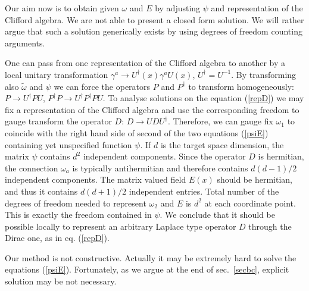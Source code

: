 \documentclass[a4paper,12pt,twoside]{article}
\begin{document}
Our aim now is to obtain given $\omega$ and $E$ by adjusting
$\psi$ and representation of the Clifford algebra. We are not able
to present a closed form solution. We will rather argue that such
a solution generically exists by using degrees of freedom counting
arguments. 

One can pass from one representation of the Clifford algebra to
another by a local unitary transformation 
$\gamma^a\to U^\dag (x)\gamma^a U(x)$, $U^\dag =U^{-1}$.
By transforming also $\tilde\omega$ and $\psi$ we can force
the operators $P$ and $P^\dag$ to transform homogeneously:
$P\to U^\dag PU$, $P^\dag P\to U^\dag P^\dag P U$.
To analyse solutions on the equation (\ref{repD}) we may fix
a representation of the Clifford algebra and use the corresponding
freedom to gauge transform the operator $D$:
$D\to UDU^\dag$. Therefore, we can
gauge fix $\omega_1$ to coincide with the right hand side of
second of the two equations (\ref{psiE}) containing yet unspecified
function $\psi$. If $d$ is the target space dimension, the 
matrix $\psi$ contains $d^2$ independent components.
Since the operator $D$ is hermitian, the connection $\omega_a$
is typically antihermitian and therefore contains $d(d-1)/2$
independent components. The matrix valued field $E(x)$ should be
hermitian, and thus it contains $d(d+1)/2$ independent entries.
Total number of the degrees of freedom needed to represent
$\omega_2$ and $E$ is $d^2$ at each coordinate point. This is
exactly the freedom contained in $\psi$. We conclude that it
should be possible locally to represent an arbitrary Laplace
type operator $D$ through the Dirac one, as in eq. (\ref{repD}).

Our method is not constructive. Actually it may be extremely
hard to solve the equations (\ref{psiE}). Fortunately, as
we argue at the end of sec.~\ref{secbc}, explicit solution may
be not necessary. 
 
\end{document}
